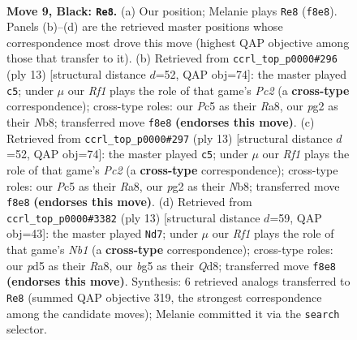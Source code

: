 \documentclass[11pt]{article}
\begin{document}
\clearpage

\begin{figure}[p]\centering
\begin{subfigure}{0.46\textwidth}\centering
\resizebox{\linewidth}{!}{%
\newchessgame
\chessboard[
  setfen={rnbq1rk1/pp2ppbp/6p1/2pP2B1/4P3/2P5/P2K1PPP/R2Q1BNR b - - 0 9},
  showmover=false,
  pgfstyle=straightmove, color=movearrow, markmove={f8-e8}
]}
\caption{}
\end{subfigure}\hfill
\begin{subfigure}{0.46\textwidth}\centering
\resizebox{\linewidth}{!}{%
\newchessgame
\chessboard[
  setfen={rnbqk2r/ppp1ppbp/6p1/6B1/3PP3/2P5/P4PPP/R2QKBNR b KQkq - 2 7},
  showmover=false,
  pgfstyle=straightmove, color=movearrow, markmove={c7-c5}
]}
\caption{}
\end{subfigure}
\\[4pt]
\begin{subfigure}{0.46\textwidth}\centering
\resizebox{\linewidth}{!}{%
\newchessgame
\chessboard[
  setfen={rnbqk2r/ppp1ppbp/6p1/6B1/3PP3/2P5/P4PPP/R2QKBNR b KQkq - 2 7},
  showmover=false,
  pgfstyle=straightmove, color=movearrow, markmove={c7-c5}
]}
\caption{}
\end{subfigure}\hfill
\begin{subfigure}{0.46\textwidth}\centering
\resizebox{\linewidth}{!}{%
\newchessgame
\chessboard[
  setfen={rnbqk2r/ppp1ppbp/6p1/8/3PP3/B1P5/P4PPP/R2QKBNR b KQkq - 2 7},
  showmover=false,
  pgfstyle=straightmove, color=movearrow, markmove={b8-d7}
]}
\caption{}
\end{subfigure}
\caption{\textbf{Move 9, Black: \texttt{Re8}.} (a) Our position; Melanie plays \texttt{Re8} (\texttt{f8e8}). Panels (b)--(d) are the retrieved master positions whose correspondence most drove this move (highest QAP objective among those that transfer to it). (b) Retrieved from \texttt{ccrl\_top\_p0000\#296} (ply 13) [structural distance $d$=52, QAP obj=74]: the master played \texttt{c5}; under $\mu$ our \emph{Rf1} plays the role of that game's \emph{Pc2} (a \textbf{cross-type} correspondence); cross-type roles: our \emph{P}c5 as their \emph{R}a8, our \emph{p}g2 as their \emph{N}b8; transferred move \texttt{f8e8} \textbf{(endorses this move)}. (c) Retrieved from \texttt{ccrl\_top\_p0000\#297} (ply 13) [structural distance $d$=52, QAP obj=74]: the master played \texttt{c5}; under $\mu$ our \emph{Rf1} plays the role of that game's \emph{Pc2} (a \textbf{cross-type} correspondence); cross-type roles: our \emph{P}c5 as their \emph{R}a8, our \emph{p}g2 as their \emph{N}b8; transferred move \texttt{f8e8} \textbf{(endorses this move)}. (d) Retrieved from \texttt{ccrl\_top\_p0000\#3382} (ply 13) [structural distance $d$=59, QAP obj=43]: the master played \texttt{Nd7}; under $\mu$ our \emph{Rf1} plays the role of that game's \emph{Nb1} (a \textbf{cross-type} correspondence); cross-type roles: our \emph{p}d5 as their \emph{R}a8, our \emph{b}g5 as their \emph{Q}d8; transferred move \texttt{f8e8} \textbf{(endorses this move)}. Synthesis: 6 retrieved analogs transferred to \texttt{Re8} (summed QAP objective 319, the strongest correspondence among the candidate moves); Melanie committed it via the \texttt{search} selector.}
\label{fig:thought-m17}
\end{figure}
\end{document}
